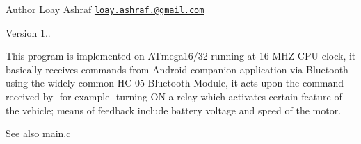 \begin{DoxyAuthor}{Author}
Loay Ashraf \href{mailto:loay.ashraf.96@gmail.com}{\tt loay.\+ashraf.@gmail.\+com} 
\end{DoxyAuthor}
\begin{DoxyVersion}{Version}
1..
\end{DoxyVersion}
This program is implemented on A\+Tmega16/32 running at 16 M\+HZ C\+PU clock, it basically receives commands from Android companion application via Bluetooth using the widely common H\+C-\/05 Bluetooth Module, it acts upon the command received by -\/for example-\/ turning ON a relay which activates certain feature of the vehicle; means of feedback include battery voltage and speed of the motor.

\begin{DoxySeeAlso}{See also}
\mbox{\hyperlink{main_8c}{main.\+c}} 
\end{DoxySeeAlso}
